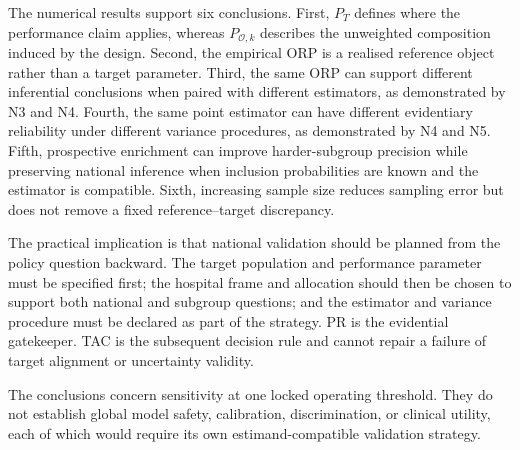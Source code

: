 The numerical results support six conclusions. First, \(P_T\) defines where
the performance claim applies, whereas \(P_{\mathcal O,k}\) describes the
unweighted composition induced by the design. Second, the empirical ORP is a
realised reference object rather than a target parameter. Third, the same ORP
can support different inferential conclusions when paired with different
estimators, as demonstrated by N3 and N4. Fourth, the same point estimator can
have different evidentiary reliability under different variance procedures,
as demonstrated by N4 and N5. Fifth, prospective enrichment can improve
harder-subgroup precision while preserving national inference when inclusion
probabilities are known and the estimator is compatible. Sixth, increasing
sample size reduces sampling error but does not remove a fixed
reference--target discrepancy.

The practical implication is that national validation should be planned from
the policy question backward. The target population and performance parameter
must be specified first; the hospital frame and allocation should then be
chosen to support both national and subgroup questions; and the estimator and
variance procedure must be declared as part of the strategy. PR is the
evidential gatekeeper. TAC is the subsequent decision rule and cannot repair a
failure of target alignment or uncertainty validity.

The conclusions concern sensitivity at one locked operating threshold. They
do not establish global model safety, calibration, discrimination, or clinical
utility, each of which would require its own estimand-compatible validation
strategy.
